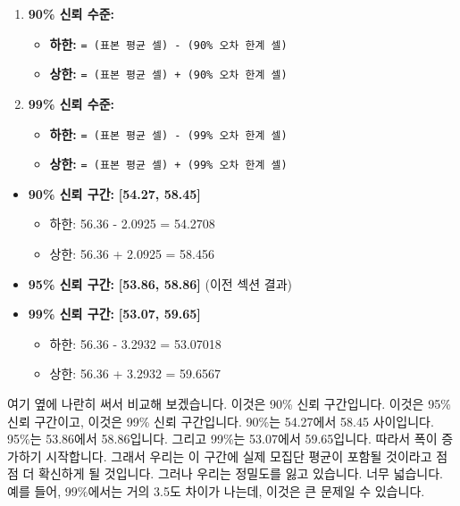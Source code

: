 \documentclass[11pt,a4paper]{article}
\theoremstyle{definition}
\newcommand{\code}[1]{\texttt{#1}}
\begin{document}
\begin{enumerate}
    \item \textbf{90\% 신뢰 수준:}
        \begin{itemize}
            \item \textbf{하한:} \code{= (표본 평균 셀) - (90\% 오차 한계 셀)}
            \item \textbf{상한:} \code{= (표본 평균 셀) + (90\% 오차 한계 셀)}
        \end{itemize}
    \item \textbf{99\% 신뢰 수준:}
        \begin{itemize}
            \item \textbf{하한:} \code{= (표본 평균 셀) - (99\% 오차 한계 셀)}
            \item \textbf{상한:} \code{= (표본 평균 셀) + (99\% 오차 한계 셀)}
        \end{itemize}
\end{enumerate}
\begin{infobox}[title=계산 결과: 신뢰 수준별 신뢰 구간]
\begin{itemize}
    \item \textbf{90\% 신뢰 구간:} \textbf{[54.27, 58.45]}
        \begin{itemize}
            \item 하한: 56.36 - 2.0925 = 54.2708
            \item 상한: 56.36 + 2.0925 = 58.456
        \end{itemize}
    \item \textbf{95\% 신뢰 구간:} \textbf{[53.86, 58.86]} (이전 섹션 결과)
    \item \textbf{99\% 신뢰 구간:} \textbf{[53.07, 59.65]}
        \begin{itemize}
            \item 하한: 56.36 - 3.2932 = 53.07018
            \item 상한: 56.36 + 3.2932 = 59.6567
        \end{itemize}
\end{itemize}
\end{infobox}

\begin{tcolorbox}[title=슬라이드 66: 뉴욕 일일 기온 샘플 Excel 시트 (13/13)]
여기 옆에 나란히 써서 비교해 보겠습니다. 이것은 90\% 신뢰 구간입니다. 이것은 95\% 신뢰 구간이고, 이것은 99\% 신뢰 구간입니다. 90\%는 54.27에서 58.45 사이입니다. 95\%는 53.86에서 58.86입니다. 그리고 99\%는 53.07에서 59.65입니다. 따라서 폭이 증가하기 시작합니다. 그래서 우리는 이 구간에 실제 모집단 평균이 포함될 것이라고 점점 더 확신하게 될 것입니다. 그러나 우리는 정밀도를 잃고 있습니다. 너무 넓습니다. 예를 들어, 99\%에서는 거의 3.5도 차이가 나는데, 이것은 큰 문제일 수 있습니다.
\end{tcolorbox}
\end{document}

